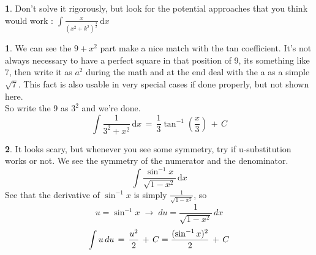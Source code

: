 \documentclass[10pt,letterpaper,twocolumn]{article}
\theoremstyle{definition}
\theoremstyle{definition}
\newtheorem{pr}{\framebox[0.07\textwidth]{Pr}}[section]
\theoremstyle{definition}
\newtheorem{sol}{\framebox[0.07\textwidth]{Sol}}[section]
\begin{document}
		\begin{pr}
Don't solve it rigorously, but look for the potential approaches that you think would work : $ \int \frac{x}
                                                                                                                                                                {	( x^2 + k^2) ^ {\frac{3}{2}} } \, \mathrm{d}x $
                                                                                                                                                                \end{pr}

\begin{sol}
We can see the $9 + x^2$ part make a nice match with the tan coefficient. It's not always necessary to have a perfect square in that position of 9, its something like 7, then write it as $a^2$ during the math and at the end deal with the a as a simple $\sqrt{7}$. This fact is also usable in very special cases if done properly, but not shown here.\\
So write the 9 as $3^2$ and we're done.
\[ \int \frac{1}{3^{2} + x^2} \, \mathrm{d} x \, = \, \frac{1}{3} \tan ^{-1}
 																									 (\frac{x}{3}) \, + \, C \]

\end{sol}

\begin{sol}
It looks scary, but whenever you see some symmetry, try if u-substitution works or not. We see the symmetry of the numerator and the denominator. 
\[ 
 \int \frac{\sin ^{-1}x}{\sqrt{1 - x^2}} \, \mathrm{d} x 
 \]
See that the derivative of $\sin^{-1} x$ is simply $\frac{1}{\sqrt{  1 - x^2      }}$, so
\[ u = \sin^{-1} x	\; \rightarrow \; du = \frac{1}{\sqrt{  1 - x^2      }} \, dx \]
\[\int u\, du \, = \, \frac{u^2}{2} \,+\, C \\
= \frac{(\sin ^{-1}x)^2}{2} \,+\, C\]
\end{sol}
\end{document}
